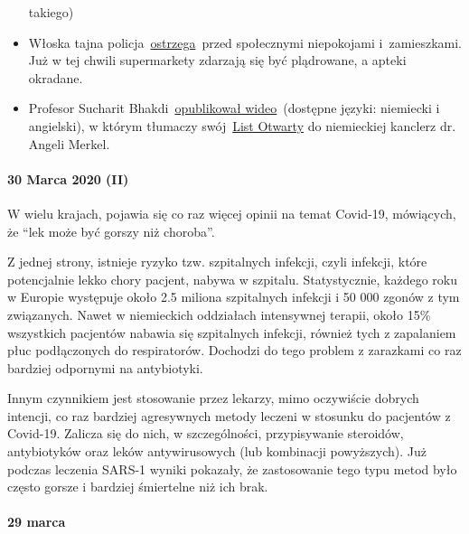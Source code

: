\begin{itemize}
  takiego)
\item
  Włoska tajna
  policja~\href{https://www.focus.de/panorama/welt/sorge-vor-sozialen-unruhen-supermaerkte-gepluendert-apotheken-ueberfallen-italiens-geheimdienst-warnt-vor-aufstaenden_id_11826664.html}{ostrzega}~przed
  społecznymi niepokojami i~zamieszkami. Już w tej chwili supermarkety
  zdarzają się być plądrowane, a apteki okradane.
\item
  Profesor Sucharit
  Bhakdi~\href{https://www.youtube.com/watch?v=LsExPrHCHbw\&feature=emb_title}{opublikował
  wideo}~(dostępne języki: niemiecki i angielski), w którym tłumaczy
  swój~\href{https://swprs.org/open-letter-from-professor-sucharit-bhakdi-to-german-chancellor-dr-angela-merkel/}{List
  Otwarty} do niemieckiej kanclerz dr. Angeli Merkel.
\end{itemize}

\hypertarget{30-marca-2020-ii}{%
\paragraph{30 Marca 2020 (II)}\label{30-marca-2020-ii}}

W wielu krajach, pojawia się co raz więcej opinii na temat Covid-19,
mówiących, że ``lek może być gorszy niż choroba''.

Z jednej strony, istnieje ryzyko tzw. szpitalnych infekcji, czyli
infekcji, które potencjalnie lekko chory pacjent, nabywa w szpitalu.
Statystycznie, każdego roku w Europie występuje około 2.5 miliona
szpitalnych infekcji i 50 000 zgonów z tym związanych. Nawet w
niemieckich oddziałach intensywnej terapii, około 15\% wszystkich
pacjentów nabawia się szpitalnych infekcji, również tych z zapalaniem
płuc podłączonych do respiratorów. Dochodzi do tego problem z zarazkami
co raz bardziej odpornymi na antybiotyki.

Innym czynnikiem jest stosowanie przez lekarzy, mimo oczywiście dobrych
intencji, co raz bardziej agresywnych metody leczeni w stosunku do
pacjentów z Covid-19. Zalicza się do nich, w szczególności,
przypisywanie steroidów, antybiotyków oraz leków antywirusowych (lub
kombinacji powyższych). Już podczas leczenia SARS-1 wyniki pokazały, że
zastosowanie tego typu metod było często gorsze i bardziej śmiertelne
niż ich brak.

\hypertarget{29-marca}{%
\paragraph{29 marca}\label{29-marca}}

